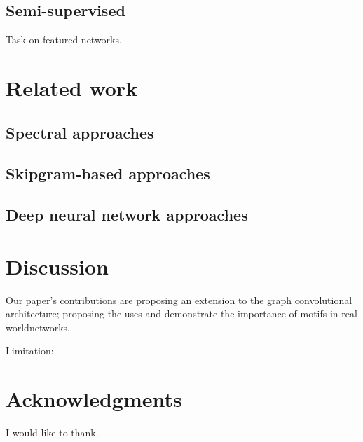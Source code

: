 \documentclass{article}
\theoremstyle{definition}
\begin{document}
\subsection{Semi-supervised}

Task on featured networks.

\section{Related work}

\subsection{Spectral approaches}

\subsection{Skipgram-based approaches }

\subsection{Deep neural network approaches}

\section{Discussion}

Our paper's contributions are proposing an extension to the graph convolutional 
architecture; proposing the uses and demonstrate the importance of motifs in
real worldnetworks.

Limitation: 


\section*{Acknowledgments}

I would like to thank.



\end{document}
